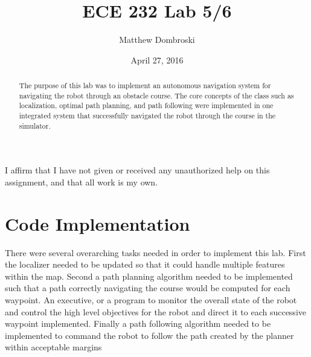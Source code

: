 \documentclass[letterpaper,12pt]{article}
\begin{document}
\title{ECE 232 Lab 5/6}
\author{Matthew Dombroski}
\date{April 27, 2016}
\maketitle


 I affirm that I have not given or received any unauthorized help on this assignment,
and that all work is my own.
\begin{abstract}
The purpose of this lab was to implement an autonomous navigation system for navigating the robot through an obstacle course. The core concepts of the class such as localization, optimal path planning, and path following were implemented in one integrated system that successfully navigated the robot through the course in the simulator. 
\end{abstract}


\section{Code Implementation}
There were several overarching tasks needed in order to implement this lab. First the localizer needed to be updated so that it could handle multiple features within the map. Second a path planning algorithm needed to be implemented such that a path correctly navigating the course would be computed for each waypoint. An executive, or a program to monitor the overall state of the robot and control the high level objectives for the robot and direct it to each successive waypoint implemented. Finally a path following algorithm needed to be implemented to command the robot to follow the path created by the planner within acceptable margins
\end{document}
